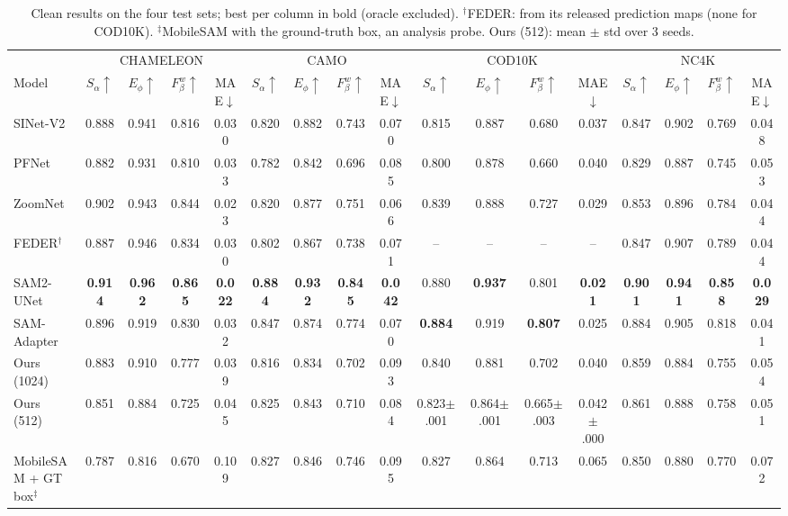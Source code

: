 \begin{table}[t]
\centering
\caption{Clean results on the four test sets; best per column in bold (oracle excluded). $^\dagger$FEDER: from its released prediction maps (none for COD10K). $^\ddagger$MobileSAM with the ground-truth box, an analysis probe. Ours (512): mean $\pm$ std over 3 seeds.}
\label{tab:clean}
\footnotesize
\setlength{\tabcolsep}{2.1pt}
\begin{tabular}{lcccccccccccccccc}
\toprule
 & \multicolumn{4}{c}{CHAMELEON} & \multicolumn{4}{c}{CAMO} & \multicolumn{4}{c}{COD10K} & \multicolumn{4}{c}{NC4K} \\
\cmidrule(lr){2-5} \cmidrule(lr){6-9} \cmidrule(lr){10-13} \cmidrule(lr){14-17}
Model & $S_\alpha\uparrow$ & $E_\phi\uparrow$ & $F_\beta^w\uparrow$ & MAE$\downarrow$ & $S_\alpha\uparrow$ & $E_\phi\uparrow$ & $F_\beta^w\uparrow$ & MAE$\downarrow$ & $S_\alpha\uparrow$ & $E_\phi\uparrow$ & $F_\beta^w\uparrow$ & MAE$\downarrow$ & $S_\alpha\uparrow$ & $E_\phi\uparrow$ & $F_\beta^w\uparrow$ & MAE$\downarrow$ \\
\midrule
SINet-V2 & 0.888 & 0.941 & 0.816 & 0.030 & 0.820 & 0.882 & 0.743 & 0.070 & 0.815 & 0.887 & 0.680 & 0.037 & 0.847 & 0.902 & 0.769 & 0.048 \\
PFNet & 0.882 & 0.931 & 0.810 & 0.033 & 0.782 & 0.842 & 0.696 & 0.085 & 0.800 & 0.878 & 0.660 & 0.040 & 0.829 & 0.887 & 0.745 & 0.053 \\
ZoomNet & 0.902 & 0.943 & 0.844 & 0.023 & 0.820 & 0.877 & 0.751 & 0.066 & 0.839 & 0.888 & 0.727 & 0.029 & 0.853 & 0.896 & 0.784 & 0.044 \\
FEDER$^\dagger$ & 0.887 & 0.946 & 0.834 & 0.030 & 0.802 & 0.867 & 0.738 & 0.071 & -- & -- & -- & -- & 0.847 & 0.907 & 0.789 & 0.044 \\
\midrule
SAM2-UNet & \textbf{0.914} & \textbf{0.962} & \textbf{0.865} & \textbf{0.022} & \textbf{0.884} & \textbf{0.932} & \textbf{0.845} & \textbf{0.042} & 0.880 & \textbf{0.937} & 0.801 & \textbf{0.021} & \textbf{0.901} & \textbf{0.941} & \textbf{0.858} & \textbf{0.029} \\
SAM-Adapter & 0.896 & 0.919 & 0.830 & 0.032 & 0.847 & 0.874 & 0.774 & 0.070 & \textbf{0.884} & 0.919 & \textbf{0.807} & 0.025 & 0.884 & 0.905 & 0.818 & 0.041 \\
\midrule
Ours (1024) & 0.883 & 0.910 & 0.777 & 0.039 & 0.816 & 0.834 & 0.702 & 0.093 & 0.840 & 0.881 & 0.702 & 0.040 & 0.859 & 0.884 & 0.755 & 0.054 \\
Ours (512) & 0.851 & 0.884 & 0.725 & 0.045 & 0.825 & 0.843 & 0.710 & 0.084 & 0.823{\tiny$\pm$.001} & 0.864{\tiny$\pm$.001} & 0.665{\tiny$\pm$.003} & 0.042{\tiny$\pm$.000} & 0.861 & 0.888 & 0.758 & 0.051 \\
\midrule
MobileSAM + GT box$^\ddagger$ & 0.787 & 0.816 & 0.670 & 0.109 & 0.827 & 0.846 & 0.746 & 0.095 & 0.827 & 0.864 & 0.713 & 0.065 & 0.850 & 0.880 & 0.770 & 0.072 \\
\bottomrule
\end{tabular}
\end{table}
